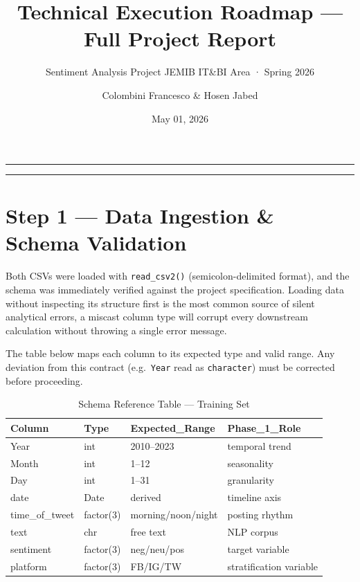 \documentclass[
]{article}
\title{Technical Execution Roadmap --- Full Project Report}
\subtitle{Sentiment Analysis Project \textbar{} JEMIB IT\&BI Area ·
Spring 2026}
\author{Colombini Francesco \& Hosen Jabed}
\date{May 01, 2026}
\begin{document}
\maketitle

{
\setcounter{tocdepth}{4}
\tableofcontents
}
\begin{center}\rule{0.5\linewidth}{0.5pt}\end{center}

\begin{center}\rule{0.5\linewidth}{0.5pt}\end{center}

\section{Step 1 --- Data Ingestion \& Schema
Validation}\label{step-1-data-ingestion-schema-validation}

Both CSVs were loaded with \texttt{read\_csv2()} (semicolon-delimited
format), and the schema was immediately verified against the project
specification. Loading data without inspecting its structure first is
the most common source of silent analytical errors, a miscast column
type will corrupt every downstream calculation without throwing a single
error message.

The table below maps each column to its expected type and valid range.
Any deviation from this contract (e.g.~\texttt{Year} read as
\texttt{character}) must be corrected before proceeding.

\begin{longtable}[t]{llll}
\caption{\label{tab:schema-table}Schema Reference Table — Training Set}\\
\toprule
Column & Type & Expected\_Range & Phase\_1\_Role\\
\midrule
Year & int & 2010–2023 & temporal trend\\
Month & int & 1–12 & seasonality\\
Day & int & 1–31 & granularity\\
date & Date & derived & timeline axis\\
time\_of\_tweet & factor(3) & morning/noon/night & posting rhythm\\
\addlinespace
text & chr & free text & NLP corpus\\
sentiment & factor(3) & neg/neu/pos & target variable\\
platform & factor(3) & FB/IG/TW & stratification variable\\
\bottomrule
\end{longtable}
\end{document}
